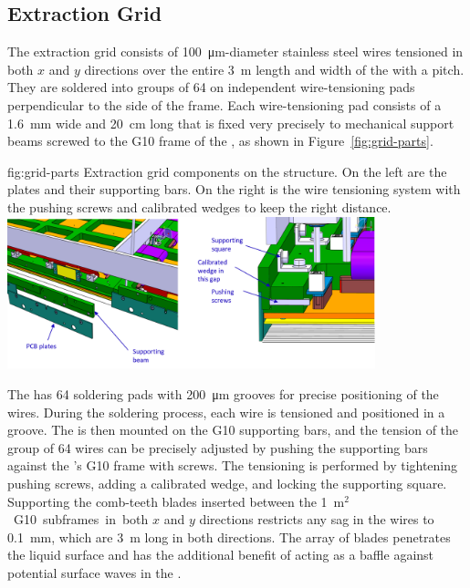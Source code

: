 \subsection{Extraction Grid}
\label{sec:fddp-crp-grid}
The extraction grid consists of \SI{100}{\micro\meter}-diameter stainless steel wires tensioned in both $x$ and $y$ directions over the entire \SI{3}{m} length and width of the  with a \dpstrippitch pitch. They are soldered into groups of \num{64} on independent wire-tensioning pads perpendicular to the side of the  frame. Each wire-tensioning pad consists of a  \SI{1.6}{mm} wide and \SI{20}{cm} long that is fixed very precisely to mechanical support beams screwed to the G10 frame of the , as shown in Figure~\ref{fig:grid-parts}.
\begin{dunefigure}{fig:grid-parts}
{Extraction grid components on the  structure. On the left are the  plates and their supporting bars. On the right is the  
wire tensioning system with the pushing screws and calibrated wedges to keep the right distance.}
\includegraphics[width=0.8\textwidth]{graphics/grid-parts}
\end{dunefigure}

The  has \num{64} soldering pads with \SI{200}{\micro\meter} grooves for precise positioning of the wires. During the 
soldering process, each wire is tensioned and positioned in a groove. The  is then mounted on the G10 supporting bars, and the tension of the group of \num{64} wires can be precisely adjusted by pushing the supporting bars against the 's G10 frame with screws. The tensioning is performed by tightening pushing screws, adding a calibrated wedge, and locking the supporting square.
Supporting the comb-teeth blades inserted between the \SI{1}{m$^2$} G10 subframes in both $x$ and $y$ directions restricts any sag in the wires to \SI{0.1}{mm}, which are \SI{3}{m} long in both directions. The array of blades penetrates the liquid surface and has the additional benefit of acting as a baffle against potential surface waves in the .

